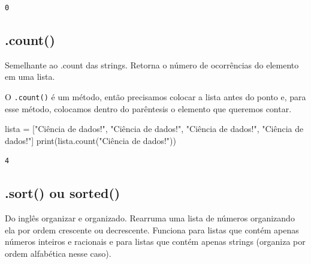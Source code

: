 \documentclass[
  letterpaper,
  DIV=11,
  numbers=noendperiod]{scrreprt}
\newenvironment{Shaded}{\begin{snugshade}}{\end{snugshade}}
\newcommand{\BuiltInTok}[1]{\textcolor[rgb]{0.00,0.23,0.31}{#1}}
\newcommand{\NormalTok}[1]{\textcolor[rgb]{0.00,0.23,0.31}{#1}}
\newcommand{\OperatorTok}[1]{\textcolor[rgb]{0.37,0.37,0.37}{#1}}
\newcommand{\StringTok}[1]{\textcolor[rgb]{0.13,0.47,0.30}{#1}}
\begin{document}
\begin{tcolorbox}[enhanced jigsaw, breakable, leftrule=.75mm, left=2mm, opacityback=0, bottomrule=.15mm, toprule=.15mm, rightrule=.15mm, arc=.35mm, colback=white]

\begin{verbatim}
0
\end{verbatim}

\end{tcolorbox}

\hypertarget{count-1}{%
\subsection{.count()}\label{count-1}}

Semelhante ao .count das strings. Retorna o número de ocorrências do
elemento em uma lista.

O \texttt{.count()} é um método, então precisamos colocar a lista antes
do ponto e, para esse método, colocamos dentro do parêntesis o elemento
que queremos contar.

\begin{Shaded}
\begin{Highlighting}[]
\NormalTok{lista }\OperatorTok{=}\NormalTok{ [}\StringTok{"Ciência de dados!"}\NormalTok{, }\StringTok{"Ciência de dados!"}\NormalTok{, }\StringTok{"Ciência de dados!"}\NormalTok{, }\StringTok{"Ciência de dados!"}\NormalTok{]}
\BuiltInTok{print}\NormalTok{(lista.count(}\StringTok{"Ciência de dados!"}\NormalTok{))}
\end{Highlighting}
\end{Shaded}

\begin{tcolorbox}[enhanced jigsaw, breakable, leftrule=.75mm, left=2mm, opacityback=0, bottomrule=.15mm, toprule=.15mm, rightrule=.15mm, arc=.35mm, colback=white]

\begin{verbatim}
4
\end{verbatim}

\end{tcolorbox}

\hypertarget{sort-ou-sorted}{%
\subsection{.sort() ou sorted()}\label{sort-ou-sorted}}

Do inglês organizar e organizado. Rearruma uma lista de números
organizando ela por ordem crescente ou decrescente. Funciona para listas
que contém apenas números inteiros e racionais e para listas que contém
apenas strings (organiza por ordem alfabética nesse caso).
\end{document}
